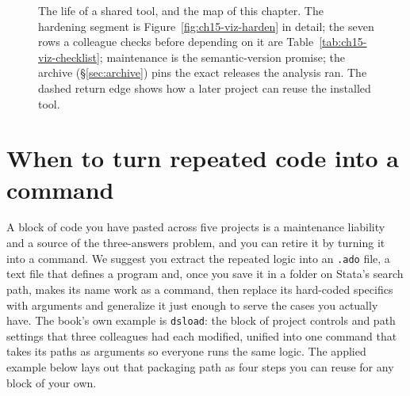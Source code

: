 \begin{figure}[htbp]
\centering
{}
\caption[The life of a shared tool]{The life of a shared tool, and the map of this chapter. The hardening segment is Figure~\ref{fig:ch15-viz-harden} in detail; the seven rows a colleague checks before depending on it are Table~\ref{tab:ch15-viz-checklist}; maintenance is the semantic-version promise; the archive (\S\ref{sec:archive}) pins the exact releases the analysis ran. The dashed return edge shows how a later project can reuse the installed tool.}
\label{fig:ch15-viz-lifecycle}
\end{figure}

\section{When to turn repeated code into a command}
A block of code you have pasted across five projects is a maintenance liability and a source of the three-answers problem, and you can retire it by turning it into a command. We suggest you extract the repeated logic into an \texttt{.ado} file, a text file that defines a program and, once you save it in a folder on Stata's search path, makes its name work as a command, then replace its hard-coded specifics with arguments and generalize it just enough to serve the cases you actually have. The book's own example is \texttt{dsload}: the block of project controls and path settings that three colleagues had each modified, unified into one command that takes its paths as arguments so everyone runs the same logic. The applied example below lays out that packaging path as four steps you can reuse for any block of your own.

